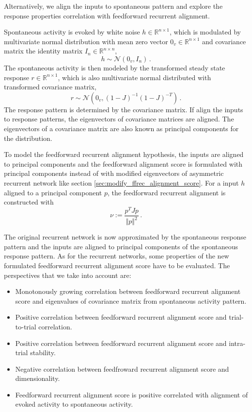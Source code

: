 \documentclass[11pt]{article}
\begin{document}
	Alternatively, we align the inputs to spontaneous pattern and explore the response properties correlation with feedforward recurrent alignment. 
	
	Spontaneous activity is evoked by white noise $h \in \mathbb{R}^{n \times 1}$, which is modulated by multivariate normal distribution with mean zero vector $0_v \in \mathbb{R}^{n \times 1}$ and covariance matrix the identity matrix $I_n \in \mathbb{R}^{n \times n}$, 
		\begin{equation}
			h \sim \mathcal{N}(0_v, I_n) \, .
		\end{equation}
	The spontaneous activity is then modeled by the transformed steady state response $r \in \mathbb{R}^{n \times 1}$, which is also multivariate normal distributed with transformed covariance matrix, 
		\begin{equation}
			r \sim \mathcal{N}\left(0_v, (1-J)^{-1}(1-J)^{-T}\right) \, .
		\end{equation}
	The response pattern is determined by the covariance matrix. If align the inputs to response patterns, the eigenvectors of covariance matrices are aligned. The eigenvectors of a covariance matrix are also known as principal components for the distribution. 
	
	To model the feedforward recurrent alignment hypothesis, the inputs are aligned to principal components and the feedforward alignment score is formulated with principal components instead of with modified eigenvectors of asymmetric recurrent network like section \ref{sec:modify_ffrec_alignment_score}. For a input $h$ aligned to a principal component $p$, the feedforward recurrent alignment is constructed with 
		\begin{equation}
			\nu := \frac{p^T J p}{\Vert p \Vert^2} \, .
		\end{equation}
	
	The original recurrent network is now approximated by the spontaneous response pattern and the inputs are aligned to principal components of the spontaneous response pattern. As for the recurrent networks, some properties of the new formulated feedforward recurrent alignment score have to be evaluated. The perspectives that we take into account are:
		\begin{itemize}
			\item Monotonously growing correlation between feedforward recurrent alignment score and eigenvalues of covariance matrix from spontaneous activity pattern.
			\item Positive correlation between feedforward recurrent alignment score and trial-to-trial correlation.
			\item Positive correlation between feedforward recurrent alignment score and intra-trial stability.
			\item Negative correlation between feedfroward recurrent alignment score and dimensionality.
			\item Feedforward recurrent alignment score is positive correlated with alignment of evoked activity to spontaneous activity.
		\end{itemize}
	
\end{document}
